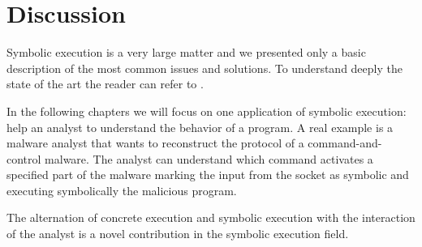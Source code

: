 \section{Discussion}

Symbolic execution is a very large matter and we presented only a basic description of the most common issues and solutions. To understand deeply the state of the art the reader can refer to \cite{SurveySymExec-CSUR18}.

In the following chapters we will focus on one application of symbolic execution: help an analyst to understand the behavior of a program.
A real example is a malware analyst that wants to reconstruct the protocol of a command-and-control malware. The analyst can understand which command activates a specified part of the malware marking the input from the socket as symbolic and executing symbolically the malicious program.

The alternation of concrete execution and symbolic execution with the interaction of the analyst is a novel contribution in the symbolic execution field.

